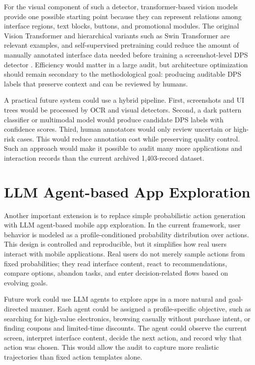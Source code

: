 For the visual component of such a detector, transformer-based vision models provide one possible starting point because they can represent relations among interface regions, text blocks, buttons, and promotional modules. The original Vision Transformer and hierarchical variants such as Swin Transformer are relevant examples, and self-supervised pretraining could reduce the amount of manually annotated interface data needed before training a screenshot-level DPS detector \cite{dosovitskiy2021an,liu2021swin,he2022masked}. Efficiency would matter in a large audit, but architecture optimization should remain secondary to the methodological goal: producing auditable DPS labels that preserve context and can be reviewed by humans.

A practical future system could use a hybrid pipeline. First, screenshots and UI trees would be processed by OCR and visual detectors. Second, a dark pattern classifier or multimodal model would produce candidate DPS labels with confidence scores. Third, human annotators would only review uncertain or high-risk cases. This would reduce annotation cost while preserving quality control. Such an approach would make it possible to audit many more applications and interaction records than the current archived 1,403-record dataset.

\section{LLM Agent-based App Exploration}

Another important extension is to replace simple probabilistic action generation with LLM agent-based mobile app exploration. In the current framework, user behavior is modeled as a profile-conditioned probability distribution over actions. This design is controlled and reproducible, but it simplifies how real users interact with mobile applications. Real users do not merely sample actions from fixed probabilities; they read interface content, react to recommendations, compare options, abandon tasks, and enter decision-related flows based on evolving goals.

Future work could use LLM agents to explore apps in a more natural and goal-directed manner. Each agent could be assigned a profile-specific objective, such as searching for high-value electronics, browsing casually without purchase intent, or finding coupons and limited-time discounts. The agent could observe the current screen, interpret interface content, decide the next action, and record why that action was chosen. This would allow the audit to capture more realistic trajectories than fixed action templates alone.

